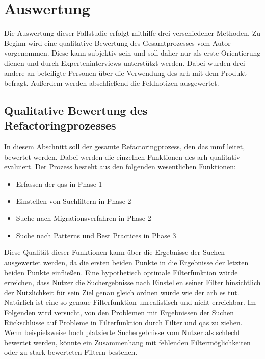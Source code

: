 \chapter{Auswertung}
\label{chap:auswertung}

Die Auswertung dieser Fallstudie erfolgt mithilfe drei verschiedener Methoden.
Zu Beginn wird eine qualitative Bewertung des Gesamtprozesses vom Autor vorgenommen. 
Diese kann subjektiv sein und soll daher nur als erste Orientierung dienen und durch Experteninterviews unterstützt werden.
Dabei wurden drei andere an \jf beteiligte Personen über die Verwendung des \gls{arh} mit dem Produkt befragt.
Außerdem werden abschließend die Feldnotizen ausgewertet.

\section{Qualitative Bewertung des Refactoringprozesses}

In diesem Abschnitt soll der gesamte Refactoringprozess, den das \gls{mmf} leitet, bewertet werden.
Dabei werden die einzelnen Funktionen des \gls{arh} qualitativ evaluiert.
Der Prozess besteht aus den folgenden wesentlichen Funktionen:
\begin{itemize}
	\item Erfassen der \glspl{qa} in Phase 1
	\item Einstellen von Suchfiltern in Phase 2
	\item Suche nach Migrationsverfahren in Phase 2
	\item Suche nach Patterns und Best Practices in Phase 3
\end{itemize}

Diese Qualität dieser Funktionen kann über die Ergebnisse der Suchen ausgewertet werden, da die ersten beiden Punkte in die Ergebnisse der letzten beiden Punkte einfließen.
Eine hypothetisch optimale Filterfunktion würde erreichen, dass Nutzer die Suchergebnisse nach Einstellen seiner Filter hinsichtlich der Nützlichkeit für sein Ziel genau gleich ordnen würde wie der \gls{arh} es tut.
Natürlich ist eine so genaue Filterfunktion unrealistisch und nicht erreichbar.
Im Folgenden wird versucht, von den Problemen mit Ergebnissen der Suchen Rückschlüsse auf Probleme in Filterfunktion durch Filter und \glspl{qa} zu ziehen.
Wenn beispielsweise hoch platzierte Suchergebnisse vom Nutzer als schlecht bewertet werden, könnte ein Zusammenhang mit fehlenden Filtermöglichkeiten oder zu stark bewerteten Filtern bestehen.

